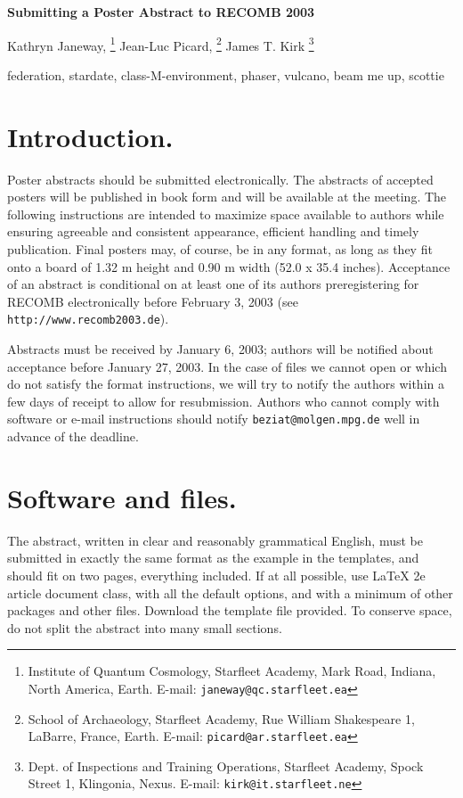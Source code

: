 \documentclass[twoside]{article}
\begin{document}
\thispagestyle{headings}
\begin{center}
\Large \bf Submitting  a Poster Abstract to RECOMB 2003\\

\vspace{.5cm}\normalsize 

Kathryn Janeway,
\footnote{Institute of Quantum Cosmology, Starfleet Academy, Mark Road, Indiana, 
North America, Earth. E-mail: {\tt janeway@qc.starfleet.ea}} 
Jean-Luc Picard,
\footnote{School of Archaeology, Starfleet Academy, Rue William Shakespeare 1, 
LaBarre, France, Earth. E-mail:  {\tt picard@ar.starfleet.ea}}
James T. Kirk
\footnote{Dept. of Inspections and Training Operations, Starfleet Academy,  
Spock Street 1, Klingonia, Nexus. E-mail:
{\tt kirk@it.starfleet.ne}} 
\end{center}

\small

\vspace{.3cm}

 federation, stardate, class-M-environment, phaser, vulcano,
 beam me up, scottie

\section{\large Introduction.} Poster abstracts should be submitted 
electronically. The abstracts of accepted posters will be published in book
form and will be available at the meeting. The following instructions are
intended to maximize space available to authors while ensuring agreeable and
consistent appearance, efficient handling and timely publication. Final posters
may, of course, be in any format, as long as they fit onto a board of 1.32 m 
height and 0.90 m width (52.0 x 35.4 inches). Acceptance of an abstract is conditional on at 
least 
one of its authors preregistering for RECOMB electronically before February 3, 2003 (see
{\tt http://www.recomb2003.de}).

Abstracts must be received by January 6, 2003; authors will be notified about
acceptance before January 27, 2003. In the case of files we cannot open or
which do not satisfy the format instructions, we will try to notify the authors
within a few days of receipt to allow for resubmission.  Authors who cannot
comply with software or e-mail instructions should notify
{\tt beziat@molgen.mpg.de} well in advance of the deadline.

\section{\large Software and files.}The abstract, written in clear and
reasonably grammatical English, must be submitted in exactly the same format as
the example in the templates, and should fit on two pages, everything included. 
If at all possible, use LaTeX 2e article document class, with all the default
options, and with a minimum of other packages and other files.  Download the
template file provided. To conserve space, do not split the abstract into many
small sections. 
\end{document}
